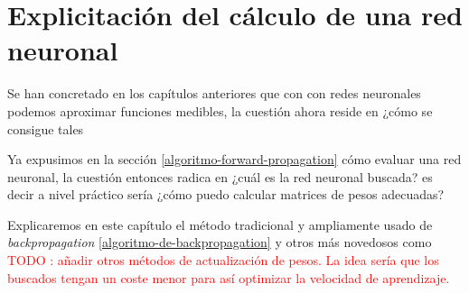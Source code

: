 %
%

\chapter{Explicitación del cálculo de una red neuronal}


Se han concretado en los capítulos anteriores que con con redes neuronales 
podemos aproximar funciones medibles, la cuestión ahora reside en ¿cómo se consigue tales 

Ya expusimos en la sección \ref{algoritmo-forward-propagation} cómo evaluar
una red neuronal, la cuestión entonces radica en ¿cuál es la red neuronal
buscada? es decir a nivel práctico sería ¿cómo puedo calcular matrices de pesos 
adecuadas?

Explicaremos en este capítulo el método tradicional y ampliamente usado de 
\textit{backpropagation} \ref{algoritmo-de-backpropagation} y otros más novedosos como
\textcolor{red}{TODO : añadir otros métodos de actualización de pesos. La idea sería que 
los buscados tengan un coste menor para así optimizar la velocidad de aprendizaje.}

